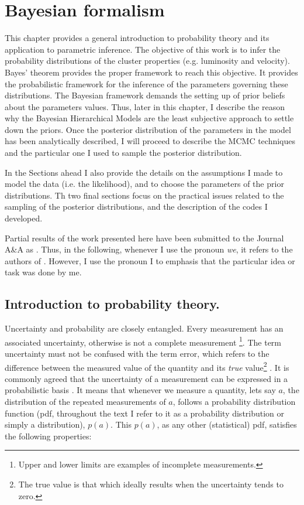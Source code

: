 \chapter{Bayesian formalism}
\label{chap:BHM}
This chapter provides a general introduction to probability theory and its application to parametric inference. The objective of this work is to infer the probability distributions of the cluster properties (e.g. luminosity and velocity). Bayes' theorem provides the proper framework to reach this objective. It provides the probabilistic framework for the inference of the parameters governing these distributions. The Bayesian framework demands the setting up of prior beliefs about the parameters values. Thus, later in this chapter, I  describe the reason why the Bayesian Hierarchical Models are the least subjective approach to settle down the priors. Once the posterior distribution of the parameters in the model has been analytically described, I will proceed to describe the MCMC techniques and the particular one I used to sample the posterior distribution. 

In the Sections ahead I also provide the details on the assumptions I made to model the data (i.e. the likelihood), and to choose the parameters of the prior distributions. Th two final sections focus on the practical issues related to the sampling of the posterior distributions, and the description of the codes I developed.

Partial results of the work presented here have been submitted to the Journal A\&A as \citet{Olivares2017}. Thus, in the following, whenever I use the pronoun \emph{we}, it refers to the authors of \citet{Olivares2017}. However, I use the pronoun I to emphasis that the particular idea or task was done by me.

\section{Introduction to probability theory.}
 
Uncertainty and probability are closely entangled. Every measurement has an associated uncertainty, otherwise is not a complete measurement \footnote{Upper and lower limits are examples of incomplete measurements.}. The term uncertainty must not be confused with the term error, which refers to the difference between the measured value of the quantity and its \emph{true} value\footnote{The true value is that which ideally results when the uncertainty tends to zero.} \citep{GUM2008}. It is commonly agreed that the uncertainty of a measurement can be expressed in a probabilistic basis \citep{GUM2008}. It means that whenever we measure a quantity, lets say $a$, the distribution of the repeated measurements of $a$, follows a probability distribution function (pdf, throughout the text I refer to it as a probability distribution or simply a distribution), $p(a)$. This $p(a)$, as any other (statistical) pdf,  satisfies the following properties:

